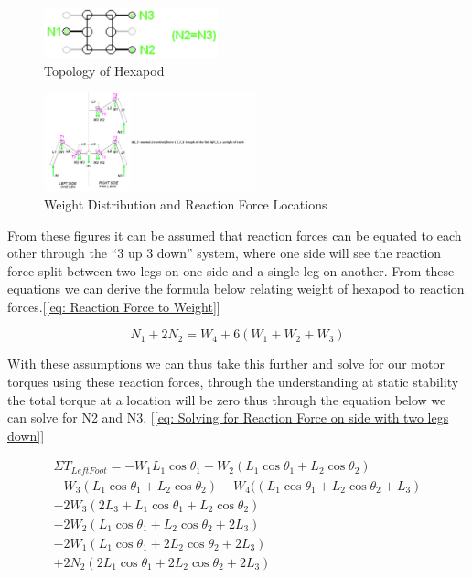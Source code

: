 \begin{figure}[h]

 \centering
   \includegraphics[width = 0.45\textwidth]{figures/12.png}            \caption{Topology of Hexapod}
   \label{fig: Diagram 2}
\end{figure}


\begin{figure}[h]

 \centering
   \includegraphics[width = 0.55\textwidth]{figures/1.png}            \caption{Weight Distribution and Reaction Force Locations}
   \label{fig: Diagram 3}
\end{figure}



From these figures it can be assumed that reaction forces can be equated to each other through the “3 up 3 down” system, where one side will see the reaction force split between two legs on one side and a single leg on another. From these equations we can derive the formula below relating weight of hexapod to reaction forces.[\ref{eq: Reaction Force to Weight}]


\begin{equation} \label{eq: Reaction Force to Weight}
N_1+2N_2 = W_4+ 6(W_1+W_2+W_3 )
\end{equation}

With these assumptions we can thus take this further and solve for our motor torques using these reaction forces, through the understanding at static stability the total torque at a location will be zero thus through the equation below we can solve for N2  and  N3.
 [\ref{eq: Solving for Reaction Force on side with two legs down}]


\begin{multline} \label{eq: Solving for Reaction Force on side with two legs down}
\Sigma T_{Left Foot} = -W_1 L_1 \cos \theta_1 - W_2 (L_1 \cos \theta_1 + L_2 \cos \theta_2)\\ - W_3 (L_1 \cos \theta_1 + L_2 \cos \theta_2) - W_4 ((L_1 \cos \theta_1 + L_2 \cos \theta_2 + L_3)\\ -2W_3 (2L_3 + L_1 \cos \theta_1 + L_2 \cos \theta_2)\\
- 2W_2 (L_1 \cos \theta_1 + L_2 \cos \theta_2 +2L_3)\\ - 2W_1 (L_1 \cos \theta_1 + 2L_2 \cos \theta_2 +2L_3)\\ + 2N_2 (2L_1 \cos \theta_1 + 2L_2 \cos \theta_2 +2L_3)
\end{multline}

